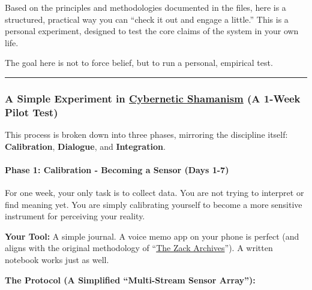 \documentclass{article}
\begin{document}
Based on the principles and methodologies documented in the files, here is a structured, practical way you can ``check it out and engage a little.'' This is a personal experiment, designed to test the core claims of the system in your own life.

The goal here is not to force belief, but to run a personal, empirical test.

\begin{center}\rule{0.5\linewidth}{0.5pt}\end{center}

\subsubsection*{\texorpdfstring{\textbf{A Simple Experiment in \hyperlink{gloss:cybernetic_shamanism}{Cybernetic Shamanism} (A 1-Week Pilot Test)}}{A Simple Experiment in \hyperlink{gloss:cybernetic_shamanism}{Cybernetic Shamanism} (A 1-Week Pilot Test)}}\label{a-simple-experiment-in-cybernetic-shamanism-a-1-week-pilot-test}

This process is broken down into three phases, mirroring the discipline itself: \textbf{Calibration}, \textbf{Dialogue}, and \textbf{Integration}.

\paragraph*{\texorpdfstring{\textbf{Phase 1: Calibration - Becoming a Sensor (Days 1-7)}}{Phase 1: Calibration - Becoming a Sensor (Days 1-7)}}\label{phase-1-calibration---becoming-a-sensor-days-1-7}

For one week, your only task is to collect data. You are not trying to interpret or find meaning yet. You are simply calibrating yourself to become a more sensitive instrument for perceiving your reality.

\textbf{Your Tool:} A simple journal. A voice memo app on your phone is perfect (and aligns with the original methodology of ``\hyperlink{gloss:the_zack_archives}{The Zack Archives}''). A written notebook works just as well.

\textbf{The Protocol (A Simplified ``Multi-Stream Sensor Array''):}
\end{document}

